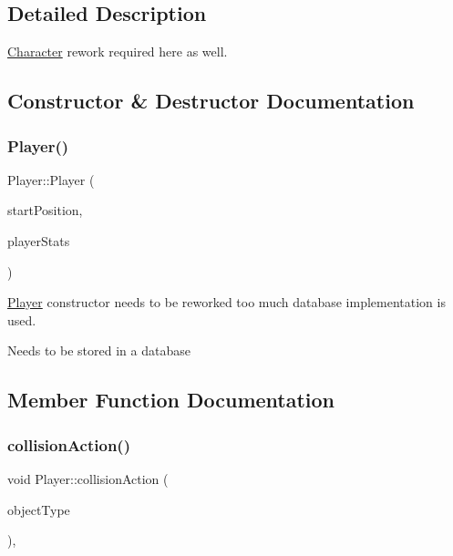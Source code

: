 \subsection{Detailed Description}
\hyperlink{class_character}{Character} rework required here as well. 

\subsection{Constructor \& Destructor Documentation}
\mbox{\label{class_player_afb985ed4c767e1ad824655b9f5f9d597}} 
\subsubsection{\texorpdfstring{Player()}{Player()}}
{\footnotesize\ttfamily Player\+::\+Player (\begin{DoxyParamCaption}\item[{\hyperlink{class_vector2_d}{Vector2D}$<$ double $>$ \&}]{start\+Position,  }\item[{\hyperlink{class_character}{Character}}]{player\+Stats }\end{DoxyParamCaption})}



\hyperlink{class_player}{Player} constructor needs to be reworked too much database implementation is used. 

Needs to be stored in a database 

\subsection{Member Function Documentation}
\mbox{\label{class_player_a965e7e8baf9b270e1b22784b890bc74d}} 
\subsubsection{\texorpdfstring{collision\+Action()}{collisionAction()}}
{\footnotesize\ttfamily void Player\+::collision\+Action (\begin{DoxyParamCaption}\item[{Game\+Object\+Type}]{object\+Type }\end{DoxyParamCaption})\hspace{0.3cm}{\ttfamily [override]}, {\ttfamily [virtual]}}

